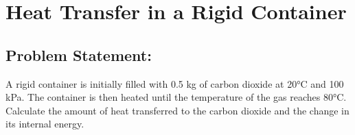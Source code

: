 \documentclass[letterpaper,10pt,english]{jupyterBook}
\begin{document}
\section{Heat Transfer in a Rigid Container}
\label{\detokenize{notebooks/Chapter4/Heat_Transfer_Rigid_Container_Problem_5:heat-transfer-in-a-rigid-container}}\label{\detokenize{notebooks/Chapter4/Heat_Transfer_Rigid_Container_Problem_5::doc}}

\subsection{Problem Statement:}
\label{\detokenize{notebooks/Chapter4/Heat_Transfer_Rigid_Container_Problem_5:problem-statement}}
\sphinxAtStartPar
A rigid container is initially filled with 0.5 kg of carbon dioxide at 20°C and 100 kPa.
The container is then heated until the temperature of the gas reaches 80°C.
Calculate the amount of heat transferred to the carbon dioxide and the change in its internal energy.
\end{document}
